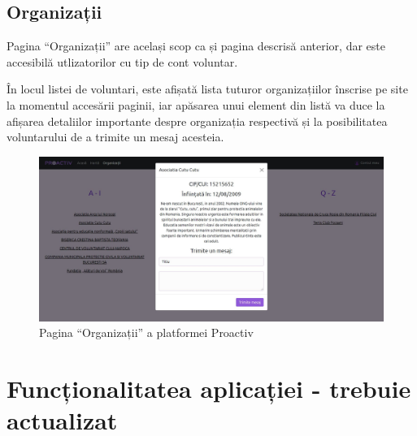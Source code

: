 \documentclass[12pt,a4paper]{report}
\begin{document}
\section{Organizații}
\par
Pagina “Organizații” are același scop ca și pagina descrisă anterior, dar este accesibilă utlizatorilor cu tip de cont voluntar.
\\\par
În locul listei de voluntari, este afișată lista tuturor organizațiilor înscrise pe site la momentul accesării paginii, iar apăsarea unui element din listă va duce la afișarea detaliilor importante despre organizația respectivă și la posibilitatea voluntarului de a trimite un mesaj acesteia.
\\
\begin{figure}[H]
\centering
  \includegraphics[width=1\linewidth]{./imagini/org.jpg}
  \caption{Pagina “Organizații” a platformei Proactiv}
\end{figure}

\chapter{Funcționalitatea aplicației - trebuie actualizat}
\end{document}

